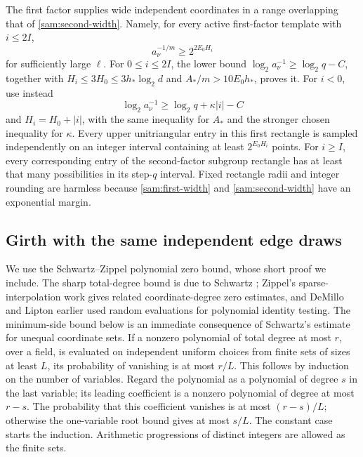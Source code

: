 The first factor supplies wide independent coordinates in a range
overlapping that of \eqref{sam:second-width}.  Namely, for every
active first-factor template with \(i\le2I\),
\begin{equation}\label{sam:first-width}
 a_\nu^{-1/m}\ge 2^{2E_0H_i}
\end{equation}
for sufficiently large \(\ell\).  For \(0\le i\le2I\), the
lower bound
\(\log_2a_\nu^{-1}\ge\log_2q-C\), together with
\(H_i\le3H_0\le3h_*\log_2d\) and
\(A_*/m>10E_0h_*\), proves it.  For \(i<0\), use instead
\[
 \log_2a_\nu^{-1}
 \ge\log_2q+\kappa|i|-C
\]
and \(H_i=H_0+|i|\), with the same inequality for \(A_*\) and
the stronger chosen inequality for \(\kappa\).
Every upper unitriangular entry in this first rectangle is sampled
independently on an integer interval containing at least
\(2^{E_0H_i}\) points.  For \(i\ge I\), every corresponding
entry of the second-factor subgroup rectangle has at least that
many possibilities in its step-\(q\) interval.  Fixed rectangle
radii and integer rounding are harmless because
\eqref{sam:first-width} and \eqref{sam:second-width} have an
exponential margin.

\subsection{Girth with the same independent edge draws}

We use the Schwartz--Zippel polynomial zero bound, whose short proof we include.
The sharp total-degree bound is due to Schwartz
\cite[Lemma~1, p.~702, and Corollary~1]{Schwartz1980}; Zippel's sparse-interpolation
work \cite[\S 3.1, Theorem~1]{Zippel1979} gives related coordinate-degree
zero estimates, and DeMillo and Lipton \cite{DeMilloLipton1978} earlier
used random evaluations for polynomial identity testing.
The minimum-side bound below is an immediate consequence of Schwartz's
estimate for unequal coordinate sets. If a nonzero
polynomial of total degree at most \(r\), over a field, is evaluated
on independent uniform choices from finite sets of sizes at least
\(L\), its probability of vanishing is at most \(r/L\).  This
follows by induction on the number of variables.  Regard the
polynomial as a polynomial of degree \(s\) in the last variable;
its leading coefficient is a nonzero polynomial of degree at most
\(r-s\).  The probability that this coefficient vanishes is at most
\((r-s)/L\); otherwise the one-variable root bound gives at most
\(s/L\).  The constant case starts the induction.  Arithmetic
progressions of distinct integers are allowed as the finite sets.

